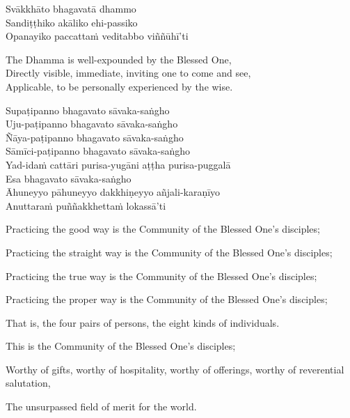 Svākkhāto bhagavatā dhammo\\
Sandiṭṭhiko akāliko ehi-passiko\\
Opanayiko paccattaṁ veditabbo viññūhī'ti

\begin{english-verses}
  The Dhamma is well-expounded by the Blessed One,\\
  Directly visible, immediate, inviting one to come and see,\\
  Applicable, to be personally experienced by the wise.
\end{english-verses}

Supaṭipanno bhagavato sāvaka-saṅgho\\
Uju-paṭipanno bhagavato sāvaka-saṅgho\\
Ñāya-paṭipanno bhagavato sāvaka-saṅgho\\
Sāmīci-paṭipanno bhagavato sāvaka-saṅgho\\
Yad-idaṁ cattāri purisa-yugāni aṭṭha purisa-puggalā\\
Esa bhagavato sāvaka-saṅgho\\
Āhuneyyo pāhuneyyo dakkhiṇeyyo añjali-karaṇīyo\\
Anuttaraṁ puññakkhettaṁ lokassā'ti

\begin{english-hang-verses}
  Practicing the good way is the Community of the Blessed One's disciples;
\end{english-hang-verses}
\begin{english-hangtogether-verses}
  Practicing the straight way is the Community of the Blessed One's disciples;
\end{english-hangtogether-verses}
\begin{english-hangtogether-verses}
  Practicing the true way is the Community of the Blessed One's disciples;
\end{english-hangtogether-verses}
\begin{english-hangtogether-verses}
  Practicing the proper way is the Community of the Blessed One's disciples;
\end{english-hangtogether-verses}
\begin{english-hangtogether-verses}
  That is, the four pairs of persons, the eight kinds of individuals.
\end{english-hangtogether-verses}
\begin{english-hangtogether-verses}
  This is the Community of the Blessed One's disciples;
\end{english-hangtogether-verses}
\begin{english-hangtogether-verses}
  Worthy of gifts, worthy of hospitality, worthy of offerings, worthy of reverential salutation,
\end{english-hangtogether-verses}
\begin{english-hangtogether-verses}
  The unsurpassed field of merit for the world.
\end{english-hangtogether-verses}

